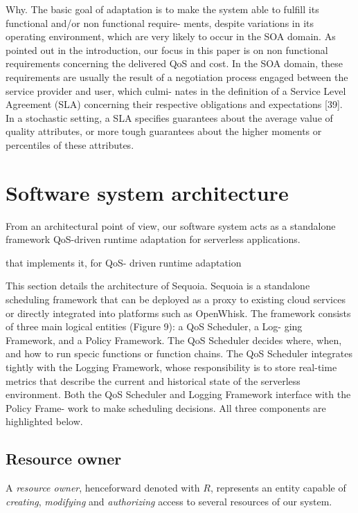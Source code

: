\documentclass[12pt,a4paper]{report}
\theoremstyle{definition}
\begin{document}
Why. The basic goal of adaptation is to make the system
able to fulfill its functional and/or non functional require-
ments, despite variations in its operating environment,
which are very likely to occur in the SOA domain. As
pointed out in the introduction, our focus in this paper is
on non functional requirements concerning the delivered
QoS and cost. In the SOA domain, these requirements
are usually the result of a negotiation process engaged
between the service provider and user, which culmi-
nates in the definition of a Service Level Agreement (SLA)
concerning their respective obligations and expectations
[39]. In a stochastic setting, a SLA specifies guarantees
about the average value of quality attributes, or more
tough guarantees about the higher moments or percentiles
of these attributes.


\section{Software system architecture}

From an architectural point of view, our software system acts as a standalone framework QoS-driven runtime adaptation for serverless applications.



 that implements it, for QoS-
driven runtime adaptation 


This section details the architecture of Sequoia. Sequoia is a
standalone scheduling framework that can be deployed as a
proxy to existing cloud services or directly integrated into
platforms such as OpenWhisk. The framework consists of
three main logical entities (Figure 9): a QoS Scheduler, a Log-
ging Framework, and a Policy Framework. The QoS Scheduler
decides where, when, and how to run specic functions or
function chains. The QoS Scheduler integrates tightly with
the Logging Framework, whose responsibility is to store
real-time metrics that describe the current and historical
state of the serverless environment. Both the QoS Scheduler
and Logging Framework interface with the Policy Frame-
work to make scheduling decisions. All three components
are highlighted below.






\subsection{Resource owner}

A \textit{resource owner}, henceforward denoted with $R$, represents an entity capable of \textit{creating}, \textit{modifying} and \textit{authorizing} access to several resources of our system.
\end{document}
